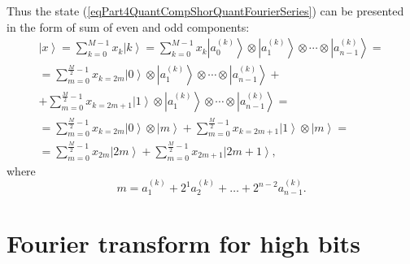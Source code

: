 \documentclass{llncs}
\begin{document}
Thus the state
(\ref{eqPart4QuantCompShorQuantFourierSeries}) 
can be presented in the form of sum of even and odd components: 
\begin{eqnarray}
\left|x\right> = \sum_{k = 0}^{M - 1}x_k \left|k\right> = 
\sum_{k = 0}^{M - 1}x_k \left|a^{(k)}_0\right> \otimes  \left|a^{(k)}_1\right>
\otimes \cdots \otimes \left|a^{(k)}_{n-1}\right> = 
\nonumber \\
 = \sum_{m = 0}^{\frac{M}{2} - 1}x_{k=2m} \left|0\right> \otimes  \left|a^{(k)}_1\right>
\otimes \cdots \otimes \left|a^{(k)}_{n-1}\right> +
\nonumber \\
+
\sum_{m = 0}^{\frac{M}{2} - 1}x_{k=2m + 1} \left|1\right> \otimes  \left|a^{(k)}_1\right>
\otimes \cdots \otimes \left|a^{(k)}_{n-1}\right> = 
\nonumber \\
 = \sum_{m = 0}^{\frac{M}{2} - 1}x_{k=2m} \left|0\right> \otimes  \left|m\right> +
\sum_{m = 0}^{\frac{M}{2} - 1}x_{k=2m + 1} \left|1\right> \otimes  \left|m\right> = 
\nonumber \\
= \sum_{m = 0}^{\frac{M}{2} - 1}x_{2m} \left|2m\right> +
\sum_{m = 0}^{\frac{M}{2} - 1}x_{2m + 1} \left|2m+1\right>,
\nonumber
\end{eqnarray}
where
\begin{equation}
m = a^{(k)}_1 + 2^1 a^{(k)}_2 + \dots + 2^{n-2} a^{(k)}_{n-1}.
\nonumber
\end{equation}

\section{Fourier transform for high bits}
\end{document}
